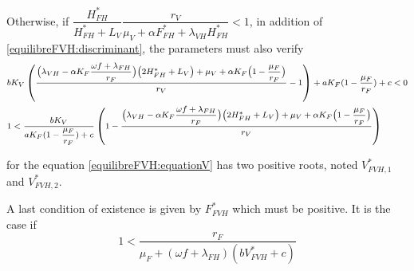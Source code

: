 \documentclass{article}
\newcommand{\lf}{\lambda_{FH}}
\newcommand{\lv}{\lambda_{VH}}
\newcommand{\FHterme}{\omega f + \lf}
\begin{document}
Otherwise, if $\dfrac{H^*_{FH}}{H^*_{FH} + L_V} \dfrac{r_V}{\mu_V + \alpha F^*_{FH} + \lv H^*_{FH}} < 1$, in addition of \eqref{equilibreFVH:discriminant}, the parameters must also verify
\begin{subequations}
{\footnotesize
\begin{align}
& b K_V \left(\dfrac{\big(\lv - \alpha K_F \dfrac{\FHterme}{r_F}\big)\big(2H^*_{FH} + L_V\big) + \mu_V + \alpha K_F \big(1-\dfrac{\mu_F}{r_F}\big)}{r_V} -1 \right)
+ aK_F(1-\dfrac{\mu_F}{r_F}) + c < 0 \\
& 1 < \dfrac{bK_V}{aK_F(1-\dfrac{\mu_F}{r_F}) + c} \left( 1 - \dfrac{\big(\lv - \alpha K_F \dfrac{\FHterme}{r_F}\big)\big(2H^*_{FH} + L_V\big) + \mu_V + \alpha K_F \big(1-\dfrac{\mu_F}{r_F}\big)}{r_V}\right)
\end{align}}
\end{subequations}

for the equation \eqref{equilibreFVH:equationV} has two positive roots, noted $V^*_{FVH, 1}$ and $V^*_{FVH, 2}$.

A last condition of existence is given by $F^*_{FVH}$ which must be positive. It is the case if
\begin{equation}
1 < \dfrac{r_F}{\mu_F + (\FHterme)(bV^*_{FVH} + c)}
\end{equation}
\end{document}
